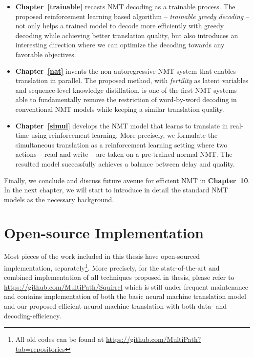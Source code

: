 \begin{itemize}
\item \textbf{Chapter~\ref{trainable}} recasts NMT decoding as a trainable process. The proposed reinforcement learning based algorithm -- {\it trainable greedy decoding} -- not only helps a trained model to decode more efficiently with greedy decoding while achieving better translation quality, but also introduces an interesting direction where we can optimize the decoding towards any favorable objectives.
\item \textbf{Chapter~\ref{nat}} invents the non-autoregressive NMT system that enables translation in parallel. The proposed method, with {\it fertility} as latent variables and sequence-level knowledge distillation, is one of the first NMT systems able to fundamentally remove the restriction of word-by-word decoding in conventional NMT models while keeping a similar translation quality.
\item \textbf{Chapter~\ref{simul}} develops the NMT model that learns to translate in real-time using reinforcement learning. More precisely, we formulate the simultaneous translation as a reinforcement learning setting where two actions -- read and write -- are taken on a pre-trained normal NMT.  The resulted model successfully achieves a balance between delay and quality. 
\end{itemize}
Finally, we conclude and discuss future avenue for efficient NMT in \textbf{Chapter~10}.	 In the next chapter, we will start to introduce in detail the standard NMT models as the necessary background.


\section{Open-source Implementation}
Most pieces of the work included in this thesis have open-sourced implementation, separately\footnote{All old codes can be found at \url{https://github.com/MultiPath?tab=repositories}}.  More precisely,
for the state-of-the-art and combined implementation of all techniques proposed in thesis,
 please refer to \url{https://github.com/MultiPath/Squirrel} which is still under frequent maintenance and  contains implementation of both the basic neural machine translation model and our proposed efficient neural machine translation with both data- and decoding-efficiency. 
